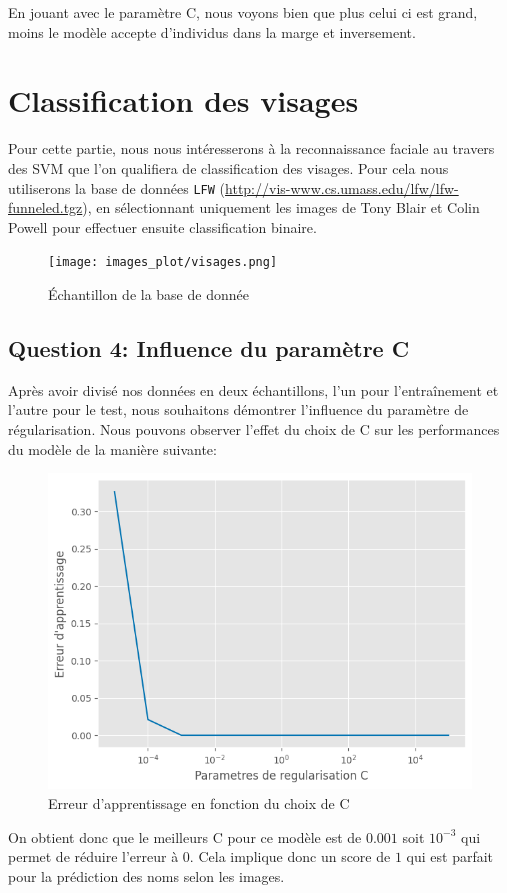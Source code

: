 \documentclass[11pt,a4paper]{article}
\begin{document}
En jouant avec le paramètre C, nous voyons bien que plus celui ci est grand, moins le modèle accepte d'individus dans la marge et inversement. 

\pagebreak
\section{Classification des visages}

Pour cette partie, nous nous intéresserons à la reconnaissance faciale au travers des SVM que l'on qualifiera de classification des visages. 
Pour cela nous utiliserons la base de données \texttt{LFW} (\url{http://vis-www.cs.umass.edu/lfw/lfw-funneled.tgz}), en sélectionnant uniquement les images de Tony Blair et Colin Powell pour effectuer ensuite classification binaire.

\begin{figure}[H]
    \centering
    \texttt{[image: images\_plot/visages.png]}
    \caption{Échantillon de la base de donnée}
    \label{fig:enter-label}
\end{figure}


\subsection{Question 4: Influence du paramètre C}

Après avoir divisé nos données en deux échantillons, l'un pour l'entraînement et l'autre pour le test, nous souhaitons démontrer l'influence du paramètre de régularisation.
Nous pouvons observer l'effet du choix de C sur les performances du modèle de la manière suivante:

\begin{figure}[H]
    \centering
    \includegraphics[width=0.5\linewidth]{images_plot/Erreur.png}
    \caption{Erreur d'apprentissage en fonction du choix de C}
    \label{fig:enter-label}
\end{figure}
On obtient donc que le meilleurs C pour ce modèle est de $0.001$ soit $10^{-3}$ qui permet de réduire l'erreur à $0$. Cela implique donc un score de $1$ qui est parfait pour la prédiction des noms selon les images.
\end{document}
